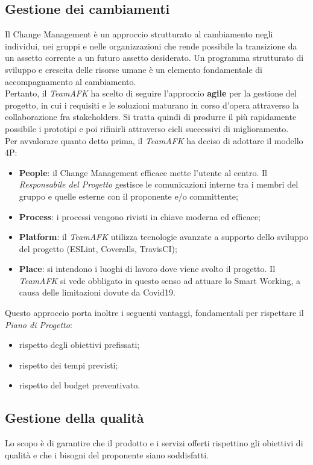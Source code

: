 \subsection{Gestione dei cambiamenti}
Il Change Management è un approccio strutturato al cambiamento negli individui, nei gruppi e nelle organizzazioni che rende possibile la transizione da un assetto corrente a un futuro assetto desiderato.
Un programma strutturato di sviluppo e crescita delle risorse umane è un elemento fondamentale di accompagnamento al cambiamento.\\ Pertanto, il \textit{TeamAFK} ha scelto di seguire l'approccio \textbf{agile} per la gestione del progetto, in cui i requisiti e le soluzioni maturano in corso d’opera attraverso la collaborazione fra stakeholders. Si tratta quindi di produrre il più rapidamente possibile i prototipi e poi rifinirli attraverso cicli successivi di miglioramento.\\
Per avvalorare quanto detto prima, il \textit{TeamAFK} ha deciso di adottare il modello 4P: \begin{itemize}
\item \textbf{People}: il Change Management efficace mette l'utente al centro. Il \textit{Responsabile del Progetto} gestisce le comunicazioni interne tra i membri del gruppo e quelle esterne con il proponente e/o committente;
\item \textbf{Process}: i processi vengono rivisti in chiave moderna ed efficace;
\item \textbf{Platform}: il \textit{TeamAFK} utilizza tecnologie avanzate a supporto dello sviluppo del progetto (ESLint, Coveralls, TravisCI);
\item \textbf{Place}: si intendono i luoghi di lavoro dove viene svolto il progetto. Il \textit{TeamAFK} si vede obbligato in questo senso ad attuare lo Smart Working, a causa delle limitazioni dovute da Covid19.
\end{itemize}
Questo approccio porta inoltre i seguenti vantaggi, fondamentali per rispettare il \textit{Piano di Progetto}: 
\begin{itemize}
\item rispetto degli obiettivi prefissati;
\item rispetto dei tempi previsti;
\item rispetto del budget preventivato.
\end{itemize}

\subsection{Gestione della qualità}
Lo scopo è di garantire che il prodotto e i servizi offerti rispettino gli obiettivi di qualità e che i bisogni del proponente siano soddisfatti. 

